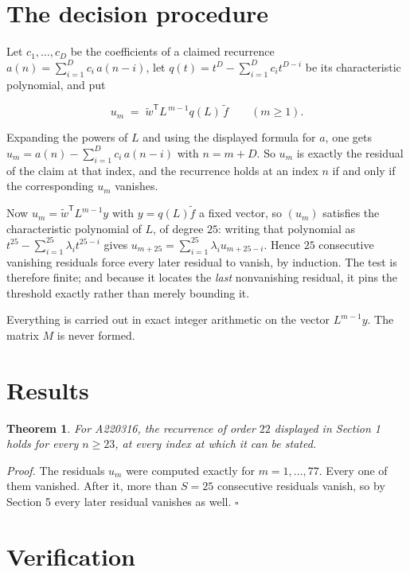 \documentclass[11pt]{article}
\newtheorem{theorem}{Theorem}
\theoremstyle{definition}
\begin{document}
\section{The decision procedure}

Let $c_1,\dots,c_D$ be the coefficients of a claimed recurrence $a(n) = \sum_{i=1}^{D} c_i\,a(n-i)$, let $q(t) = t^{D} - \sum_{i=1}^{D} c_i t^{D-i}$ be its characteristic polynomial, and put

\[u_m \;=\; \tilde w^{\mathsf T} L^{\,m-1} q(L)\,\tilde f \qquad (m \ge 1).\]

Expanding the powers of $L$ and using the displayed formula for $a$, one gets $u_m = a(n) - \sum_{i=1}^{D} c_i\,a(n-i)$ with $n = m + D$. So $u_m$ is exactly the residual of the claim at that index, and the recurrence holds at an index $n$ if and only if the corresponding $u_m$ vanishes.

Now $u_m = \tilde w^{\mathsf T} L^{m-1} y$ with $y = q(L)\tilde f$ a fixed vector, so $(u_m)$ satisfies the characteristic polynomial of $L$, of degree $25$: writing that polynomial as $t^{25} - \sum_{i=1}^{25} \lambda_i t^{25-i}$ gives $u_{m+25} = \sum_{i=1}^{25} \lambda_i u_{m+25-i}$. Hence $25$ consecutive vanishing residuals force every later residual to vanish, by induction. The test is therefore finite; and because it locates the {\itshape last} nonvanishing residual, it pins the threshold exactly rather than merely bounding it.

Everything is carried out in exact integer arithmetic on the vector $L^{m-1}y$. The matrix $M$ is never formed.

\section{Results}

\begin{theorem} For A220316, the recurrence of order $22$ displayed in Section 1 holds for every $n \ge 23$, at every index at which it can be stated.\end{theorem}

{\itshape Proof.} The residuals $u_m$ were computed exactly for $m = 1,\dots,77$. Every one of them vanished. After it, more than $S = 25$ consecutive residuals vanish, so by Section 5 every later residual vanishes as well. $\square$

\section{Verification}
\end{document}
